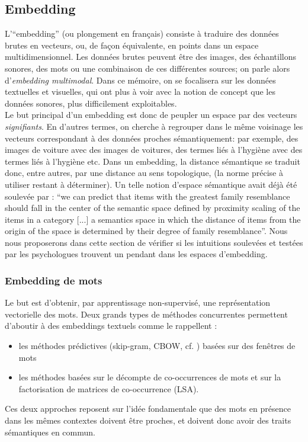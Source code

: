 \documentclass[french]{article}
\begin{document}
		\subsection{Embedding}
			L'``embedding'' (ou plongement en français) consiste à traduire des données brutes en vecteurs, ou, de façon équivalente, en points dans un espace multidimensionnel. Les données brutes peuvent être des images, des échantillons sonores, des mots ou une combinaison de ces différentes sources; on parle alors d'\textit{embedding multimodal}. Dans ce mémoire, on se focalisera sur les données textuelles et visuelles, qui ont plus à voir avec la notion de concept que les données sonores, plus difficilement exploitables.\\
			Le but principal d'un embedding est donc de peupler un espace par des vecteurs \textit{signifiants}. En d'autres termes, on cherche à regrouper dans le même voisinage les vecteurs correspondant à des données proches sémantiquement: par exemple, des images de voiture avec des images de voitures, des termes liés à l'hygiène avec des termes liés à l'hygiène etc. Dans un embedding, la distance sémantique se traduit donc, entre autres, par une distance au sens topologique, (la norme précise à utiliser restant à déterminer). Un telle notion d'espace sémantique avait déjà été soulevée par \cite{rosch1975} : ``we can predict that items with the greatest family resemblance should fall in the center of the semantic space defined by proximity scaling of the items in a category [...] a semantics space in which the distance of items from the origin of the space is determined by their degree of family resemblance''. Nous nous proposerons dans cette section de vérifier si les intuitions soulevées et testées par les psychologues trouvent un pendant dans les espaces d'embedding.
			\subsubsection{Embedding de mots}
			Le but est d'obtenir, par apprentissage non-supervisé, une représentation vectorielle des mots. Deux grands types de méthodes concurrentes permettent d'aboutir à des embeddings textuels comme le rappellent \cite{pennington2014}:
			\begin{itemize}
				\item les méthodes prédictives (skip-gram, CBOW, cf. \cite{mikolov2013}) basées sur des fenêtres de mots
				\item les méthodes basées sur le décompte de co-occurrences de mots et sur la factorisation de matrices de co-occurrence (LSA).
			\end{itemize}
			Ces deux approches reposent sur l'idée fondamentale que des mots en présence dans les mêmes contextes doivent être proches, et doivent donc avoir des traits sémantiques en commun.
\end{document}
